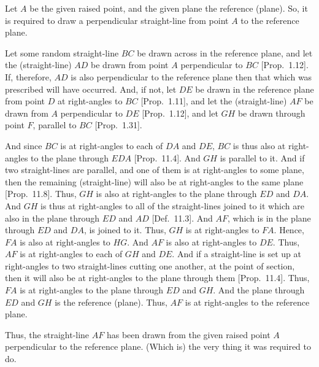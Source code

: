 \begin{Parallel}{}{}
{\epsfysize=2.5in
\centerline{}

Let $A$ be the given raised point, and the given plane the reference (plane).
So, it is required to draw a perpendicular straight-line from point $A$
to the reference plane.

Let some random straight-line $BC$ be drawn across in the reference plane, and let the  (straight-line) $AD$ be
drawn from point $A$ perpendicular to $BC$ [Prop.~1.12].
If, therefore, $AD$ is also perpendicular to the reference plane then that which
was prescribed will have occurred. And, if not, let $DE$ be
drawn in the reference plane from point $D$  at right-angles to $BC$ [Prop.~1.11], and let the (straight-line) $AF$
be drawn from $A$ perpendicular to $DE$ [Prop.~1.12],
and let $GH$ be drawn through point $F$, parallel to $BC$ [Prop.~1.31].

And since $BC$ is at right-angles to each of $DA$ and $DE$, $BC$ is
thus also at right-angles to the plane through $EDA$ [Prop.~11.4]. And $GH$ is parallel to it. And if two 
straight-lines are parallel, and one of them is at right-angles to some plane, then the
remaining (straight-line) will also be at right-angles to the same plane
[Prop.~11.8]. Thus, $GH$ is also
at right-angles to the plane through $ED$ and $DA$. And $GH$ is thus
at right-angles to all of the straight-lines joined to it which are also
in the plane through $ED$ and $AD$ [Def.~11.3].
And $AF$, which is in the plane through $ED$ and $DA$, is joined to it.
Thus, $GH$ is at right-angles to $FA$. Hence, $FA$ is also
at right-angles to $HG$. And $AF$ is also at right-angles to $DE$.
Thus, $AF$ is at right-angles to each of $GH$ and $DE$. And if a straight-line is set up at right-angles to two straight-lines cutting one another, at the
point of section, then it will also be at right-angles to the plane through them
[Prop.~11.4]. Thus, $FA$ is at right-angles to the
plane through $ED$ and $GH$. And the plane through $ED$ and
$GH$ is the reference (plane). Thus, $AF$ is at right-angles to
the reference plane.

Thus, the  straight-line $AF$ has been drawn from the given raised point 
$A$ perpendicular to the reference plane. (Which is) the very thing it was required to do.}
\end{Parallel}

